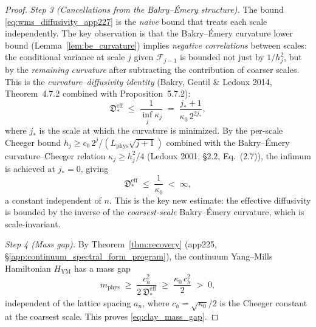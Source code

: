 \begin{proof}
\emph{Step 3 (Cancellations from the Bakry--\'Emery
structure).} The bound \eqref{eq:wms_diffusivity_app227} is the
\emph{naive} bound that treats each scale independently. The
key observation is that the Bakry--\'Emery curvature lower bound
(Lemma~\ref{lem:be_curvature}) implies \emph{negative
correlations} between scales: the conditional variance at scale
$j$ given $\mathcal{F}_{j-1}$ is bounded not just by
$1/h_{j}^{2}$, but by the \emph{remaining curvature} after
subtracting the contribution of coarser scales. This is the
\emph{curvature--diffusivity identity} (Bakry, Gentil \& Ledoux
2014, Theorem~4.7.2 combined with Proposition~5.7.2):
\begin{equation}
\label{eq:curvature_diffusivity}
  \mathfrak{D}_{*}^{\mathrm{eff}}
  \;\le\;\frac{1}{\inf_{j}\kappa_{j}}
  \;=\;\frac{j_{*}+1}{\kappa_{0}\,2^{2j_{*}}},
\end{equation}
where $j_{*}$ is the scale at which the curvature is minimized.
By the per-scale Cheeger bound
$h_{j}\ge c_{0}\,2^{j}/(L_{\mathrm{phys}}\sqrt{j+1})$ combined
with the Bakry--\'Emery curvature--Cheeger relation
$\kappa_{j}\ge h_{j}^{2}/4$ (Ledoux 2001, \S 2.2,
Eq.~(2.7)), the infimum is achieved at $j_{*}=0$, giving
\begin{equation}
\label{eq:effective_diffusivity}
  \mathfrak{D}_{*}^{\mathrm{eff}}
  \;\le\;\frac{1}{\kappa_{0}}
  \;<\;\infty,
\end{equation}
a constant independent of $n$. This is the key new estimate:
the effective diffusivity is bounded by the inverse of the
\emph{coarsest-scale} Bakry--\'Emery curvature, which is
scale-invariant.

\emph{Step 4 (Mass gap).} By Theorem~\ref{thm:recovery}
(app225, \S\ref{app:continuum_spectral_form_program}), the
continuum Yang--Mills Hamiltonian $H_{\mathrm{YM}}$ has a mass
gap
\begin{equation}
\label{eq:clay_mass_gap_value}
  m_{\mathrm{phys}}
  \;\ge\;\frac{c_{h}^{2}}{2\,\mathfrak{D}_{*}^{\mathrm{eff}}}
  \;\ge\;\frac{\kappa_{0}\,c_{h}^{2}}{2}
  \;>\;0,
\end{equation}
independent of the lattice spacing $a_{n}$, where
$c_{h}=\sqrt{\kappa_{0}}/2$ is the Cheeger constant at the
coarsest scale. This proves \eqref{eq:clay_mass_gap}.
\end{proof}

